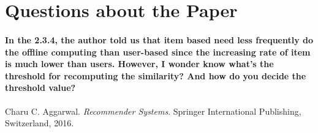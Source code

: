 \documentclass{article}
\begin{document}
\section{Questions about the Paper}
\paragraph{
In the 2.3.4, the author told us that item based need less frequently do the offline computing than user-based since the increasing rate of item is much lower than users. However, I wonder know what's the threshold for recomputing the similarity? And how do you decide the threshold value?
}
\begin{thebibliography}{1}
Charu C. Aggarwal. 
\textit{Recommender Systems}. 
Springer International Publishing, Switzerland, 2016.
 
\end{thebibliography}
\end{document}

